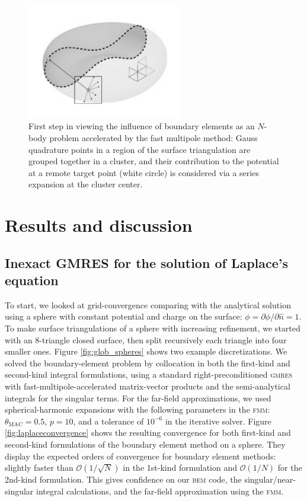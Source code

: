 \documentclass[final,leqno,]{siamltex1213}
\newcommand{\bem}{\textsc{bem}\xspace}
\newcommand{\fmm}{\textsc{fmm}\xspace}
\renewcommand{\O}[1]{\mathcal{O}(#1)}
\newcommand{\gmres}{\textsc{gmres}\xspace}
\newcommand{\partialdi}[2]{\partial #1 / \partial #2}
\newcommand{\nhat}{\hat{n}}
\begin{document}
\begin{figure}
\begin{center}
	\includegraphics[width=0.6\textwidth]{redbloodcell-panel-fmm.pdf}
	\caption{First step in viewing the influence of boundary elements as an $N$-body problem accelerated by the fast multipole method: Gauss quadrature points in a region of the surface triangulation are grouped together in a cluster, and their contribution to the potential at a remote target point (white circle) is considered via a series expansion at the cluster center.}
	\label{fig:rbc_fmmbox}
\end{center}
\end{figure}

\section{Results and discussion}

\subsection{Inexact {\small GMRES} for the solution of Laplace's equation}
To start, we looked at grid-convergence comparing with the analytical solution using a sphere with constant potential and charge on the surface: $\phi = \partialdi{\phi}{\nhat} = 1$. To make surface triangulations of a sphere with increasing refinement, we started with an 8-triangle closed surface, then split recursively each triangle into four smaller ones. Figure \ref{fig:glob_spheres} shows two example discretizations. We solved the boundary-element problem by collocation in both the first-kind and second-kind integral formulations, using a standard right-preconditioned \gmres with fast-multipole-accelerated matrix-vector products and the semi-analytical integrals for the singular terms. For the far-field approximations, we used spherical-harmonic expansions with the following parameters in the \fmm: $\theta_{\text{MAC}} = 0.5$, $p = 10$, and a tolerance of $10^{-6}$ in the iterative solver. 
Figure \ref{fig:laplaceconvergence} shows the resulting convergence for both first-kind and second-kind formulations of the boundary element method on a sphere. They display the expected orders of convergence for boundary element methods: slightly faster than $\O{1/\sqrt{N}}$ in the 1st-kind formulation and $\O{1/N}$ for the 2nd-kind formulation. This gives confidence on our \bem code, the singular/near-singular integral calculations, and the far-field approximation using the \fmm.
\end{document}

